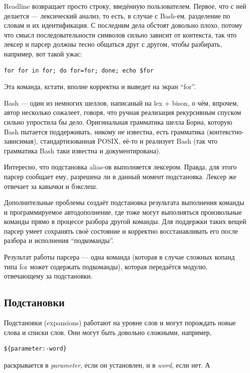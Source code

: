\documentclass[a5paper]{article}
\begin{document}
Readline возвращает просто строку, введённую пользователем. Первое, что с ней делается --- лексический анализ, то есть, в случае с Bash-ем, разделение по словам и их идентификация. С последним дела обстоят довольно плохо, потому что смысл последовательности символов сильно зависит от контекста, так что лексер и парсер должны тесно общаться друг с другом, чтобы разбирать, например, вот такой ужас:

\begin{verbatim}
for for in for; do for=for; done; echo $for
\end{verbatim}

Эта команда, кстати, вполне корректна и выведет на экран ``for''.

Bash --- один из немногих шеллов, написаный на lex + bison, о чём, впрочем, автор несколько сожалеет, говоря, что ручная реализация рекурсивным спуском сильно упростила бы дело. Оригинальная грамматика шелла Борна, которую Bash пытается поддерживать, никому не известна, есть грамматика (контекстно-зависимая), стандартизованная POSIX, её-то и реализует Bash (так что грамматика Bash таки известна и документирована).

Интересно, что подстановка alias-ов выполняется лексером. Правда, для этого парсер сообщает ему, разрешена ли в данный момент подстановка. Лексер же отвечает за кавычки и бэкслеш.

Дополнительные проблемы создаёт подстановка результата выполнения команды и программируемое автодополнение, где тоже могут выполняться произвольные команды прямо в процессе разбора другой команды. Для поддержки таких вещей парсер умеет сохранять своё состояние и корректно восстанавливать его после разбора и исполнения ``подкоманды''.

Результат работы парсера --- одна команда (которая в случае сложных копанд типа for может содержать подкоманды), которая передаётся модулю, отвечающему за подстановки.

\subsection{Подстановки}

Подстановки (expansions) работают на уровне слов и могут порождать новые слова и списки слов. Они могут быть довольно сложными, например,

\begin{verbatim}
${parameter:-word}
\end{verbatim}

раскрывается в \textit{parameter}, если он установлен, и в \textit{word}, если нет. А
\end{document}
